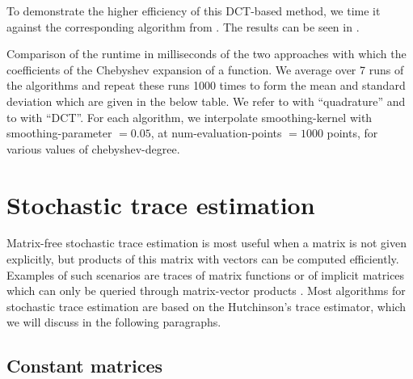 To demonstrate the higher efficiency of this \gls{DCT}-based method, we time it
against the corresponding algorithm from \cite{lin2017randomized}. The results
can be seen in .

\begin{table}[ht]
    \caption{Comparison of the runtime in milliseconds of the two approaches with which the coefficients
        of the Chebyshev expansion of a function. We average over 7 runs of the
        algorithms and repeat these runs 1000 times to form the mean and standard
        deviation which are given in the below table. We refer to
        \cite[algorithm~1]{lin2017randomized} with \enquote{quadrature}
        and to  with \enquote{DCT}.
        For each algorithm, we interpolate \gls{smoothing-kernel} with \gls{smoothing-parameter} $=0.05$,
        at \gls{num-evaluation-points} $=1000$ points, for various values of \gls{chebyshev-degree}.}
    \label{tab:2-chebyshev-timing-interpolation}
   
\end{table}


\section{Stochastic trace estimation}
\label{sec:2-chebyshev-stochastic-trace-estimation}

Matrix-free stochastic trace estimation is most useful when a matrix is not given
explicitly, but products of this matrix with vectors can be computed
efficiently. Examples of such scenarios are traces of matrix functions
\cite{ubaru2017lanczos,epperly2023xtrace} or of implicit matrices which can only
be queried through matrix-vector products \cite{ghorbani2019investigation,adepu2021hessian}.
Most algorithms for stochastic trace estimation are based on the Hutchinson's
trace estimator, which we will discuss in the following paragraphs.\\

\subsection{Constant matrices}
\label{subsec:2-chebyshev-trace-constant}

